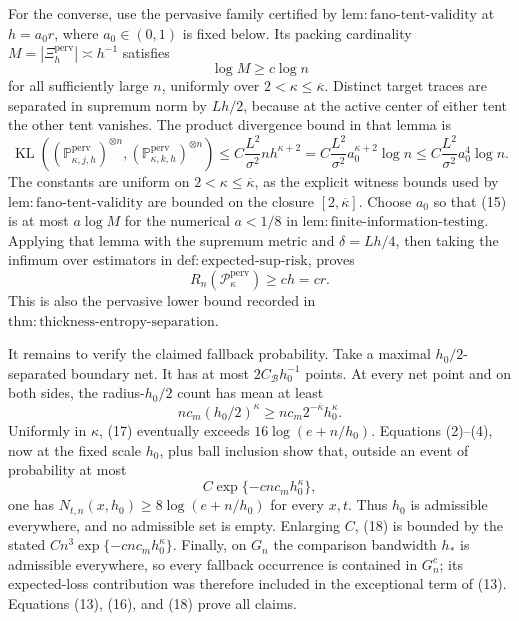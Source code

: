 For the converse, use the pervasive family certified by \(\mathrm{lem:fano\text{-}tent\text{-}validity}\) at \(h=a_0r\), where \(a_0\in(0,1)\) is fixed below. Its packing cardinality \(M=|\Xi_h^{\mathrm{perv}}|\asymp h^{-1}\) satisfies
\[
\log M\ge c\log n \tag{14}
\]
for all sufficiently large \(n\), uniformly over \(2<\kappa\le\overline\kappa\). Distinct target traces are separated in supremum norm by \(Lh/2\), because at the active center of either tent the other tent vanishes. The product divergence bound in that lemma is
\[
\operatorname{KL}\left(
(\mathbb P_{\kappa,j,h}^{\mathrm{perv}})^{\otimes n},
(\mathbb P_{\kappa,k,h}^{\mathrm{perv}})^{\otimes n}
\right)
\le C\frac{L^2}{\sigma^2}nh^{\kappa+2}
=C\frac{L^2}{\sigma^2}a_0^{\kappa+2}\log n
\le C\frac{L^2}{\sigma^2}a_0^4\log n. \tag{15}
\]
The constants are uniform on \(2<\kappa\le\overline\kappa\), as the explicit witness bounds used by \(\mathrm{lem:fano\text{-}tent\text{-}validity}\) are bounded on the closure \([2,\overline\kappa]\). Choose \(a_0\) so that (15) is at most \(a\log M\) for the numerical \(a<1/8\) in \(\mathrm{lem:finite\text{-}information\text{-}testing}\). Applying that lemma with the supremum metric and \(\delta=Lh/4\), then taking the infimum over estimators in \(\mathrm{def:expected\text{-}sup\text{-}risk}\), proves
\[
R_n(\mathcal P_{\kappa}^{\mathrm{perv}})\ge ch=cr. \tag{16}
\]
This is also the pervasive lower bound recorded in \(\mathrm{thm:thickness\text{-}entropy\text{-}separation}\).

It remains to verify the claimed fallback probability. Take a maximal \(h_0/2\)-separated boundary net. It has at most \(2C_{\mathcal B}h_0^{-1}\) points. At every net point and on both sides, the radius-\(h_0/2\) count has mean at least
\[
nc_m(h_0/2)^{\kappa}\ge nc_m2^{-\overline\kappa}h_0^{\kappa}. \tag{17}
\]
Uniformly in \(\kappa\), (17) eventually exceeds \(16\log(e+n/h_0)\). Equations (2)--(4), now at the fixed scale \(h_0\), plus ball inclusion show that, outside an event of probability at most
\[
C\exp\{-cnc_mh_0^{\kappa}\}, \tag{18}
\]
one has \(N_{t,n}(x,h_0)\ge8\log(e+n/h_0)\) for every \(x,t\). Thus \(h_0\) is admissible everywhere, and no admissible set is empty. Enlarging \(C\), (18) is bounded by the stated \(Cn^3\exp\{-cnc_mh_0^{\kappa}\}\). Finally, on \(G_n\) the comparison bandwidth \(h_*\) is admissible everywhere, so every fallback occurrence is contained in \(G_n^c\); its expected-loss contribution was therefore included in the exceptional term of (13). Equations (13), (16), and (18) prove all claims.
